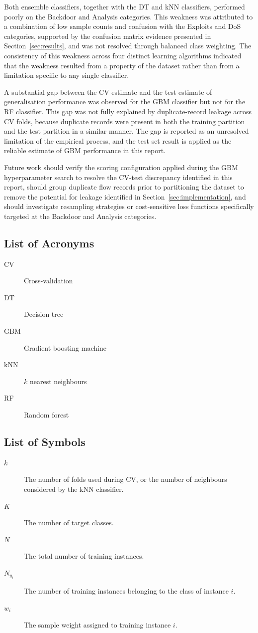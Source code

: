\documentclass[conference,10pt]{IEEEtran}
\begin{document}
Both ensemble classifiers, together with the DT and kNN classifiers, performed poorly on the Backdoor and Analysis categories. This weakness was attributed to a combination of low sample counts and confusion with the Exploits and DoS categories, supported by the confusion matrix evidence presented in Section~\ref{sec:results}, and was not resolved through balanced class weighting. The consistency of this weakness across four distinct learning algorithms indicated that the weakness resulted from a property of the dataset rather than from a limitation specific to any single classifier.

A substantial gap between the CV estimate and the test estimate of generalisation performance was observed for the GBM classifier but not for the RF classifier. This gap was not fully explained by duplicate-record leakage across CV folds, because duplicate records were present in both the training partition and the test partition in a similar manner. The gap is reported as an unresolved limitation of the empirical process, and the test set result is applied as the reliable estimate of GBM performance in this report.

Future work should verify the scoring configuration applied during the GBM hyperparameter search to resolve the CV-test discrepancy identified in this report, should group duplicate flow records prior to partitioning the dataset to remove the potential for leakage identified in Section~\ref{sec:implementation}, and should investigate resampling strategies or cost-sensitive loss functions specifically targeted at the Backdoor and Analysis categories.

\appendix

\subsection{List of Acronyms}
\begin{description}
\item[CV] Cross-validation
\item[DT] Decision tree
\item[GBM] Gradient boosting machine
\item[kNN] $k$ nearest neighbours
\item[RF] Random forest
\end{description}

\subsection{List of Symbols}
\begin{description}
\item[$k$] The number of folds used during CV, or the number of neighbours considered by the kNN classifier.
\item[$K$] The number of target classes.
\item[$N$] The total number of training instances.
\item[$N_{y_i}$] The number of training instances belonging to the class of instance $i$.
\item[$w_i$] The sample weight assigned to training instance $i$.
\end{description}
\end{document}
